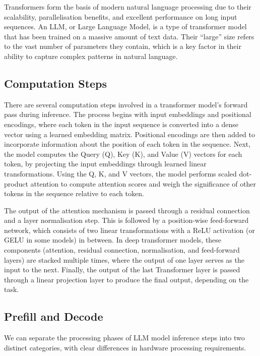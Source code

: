 Transformers form the basis of modern natural language processing due to their scalability, parallelisation benefits, and excellent performance on long input sequences.
An LLM, or Large Language Model, is a type of transformer model that has been trained on a massive amount of text data.
Their ``large'' size refers to the vast number of parameters they contain, which is a key factor in their ability to capture complex patterns in natural language. %

\subsection{Computation Steps}
There are several computation steps involved in a transformer model's forward pass during inference.
The process begins with input embeddings and positional encodings, where each token in the input sequence is converted into a dense vector using a learned embedding matrix.
Positional encodings are then added to incorporate information about the position of each token in the sequence.
Next, the model computes the Query (Q), Key (K), and Value (V) vectors for each token, by projecting the input embeddings through learned linear transformations.
Using the Q, K, and V vectors, the model performs scaled dot-product attention to compute attention scores and weigh the significance of other tokens in the sequence relative to each token. %

The output of the attention mechanism is passed through a residual connection and a layer normalisation step.
This is followed by a position-wise feed-forward network, which consists of two linear transformations with a ReLU activation (or GELU in some models) in between.
In deep transformer models, these components (attention, residual connection, normalisation, and feed-forward layers) are stacked multiple times, where the output of one layer serves as the input to the next.
Finally, the output of the last Transformer layer is passed through a linear projection layer to produce the final output, depending on the task. %

\subsection{Prefill and Decode}
\label{chap:prefill-decode}
We can separate the processing phases of LLM model inference steps into two distinct categories, with clear differences in hardware processing requirements.

